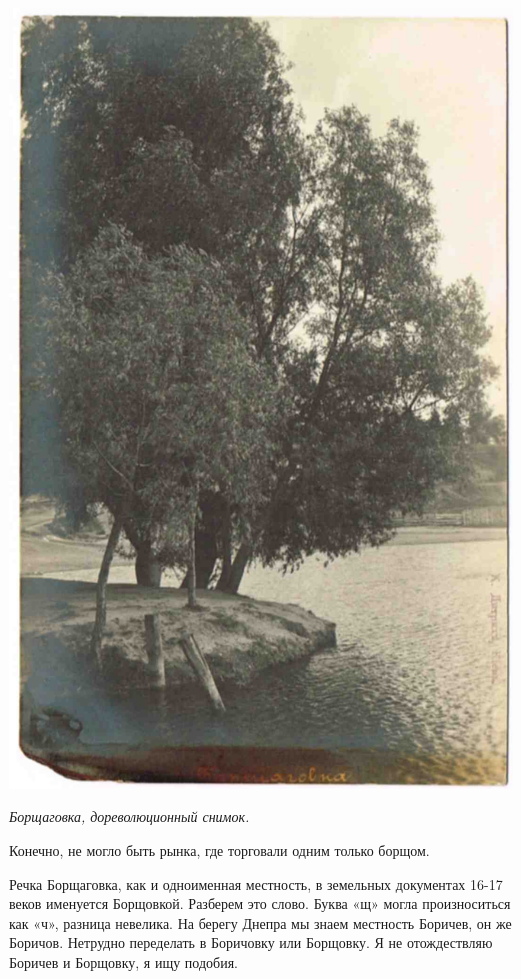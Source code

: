 \newpage
\begin{center}
\includegraphics[width=\textwidth]{chast-troya/troya-kiev/borsh.jpg}

\textit{Борщаговка, дореволюционный снимок.}
\end{center}
\newpage

Конечно, не могло быть рынка, где торговали одним только борщом. 

Речка Борщаговка, как и одноименная местность, в земельных документах 16-17 веков именуется Борщовкой. Разберем это слово. Буква «щ» могла произноситься как «ч», разница невелика. На берегу Днепра мы знаем местность Боричев, он же Боричов. Нетрудно переделать в Боричовку или Борщовку. Я не отождествляю Боричев и Борщовку, я ищу подобия.

